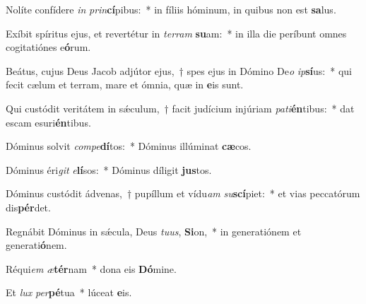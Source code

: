 \item Nolíte confídere \textit{in} \textit{prin}\textbf{cí}pibus:~* in fíliis hóminum, in quibus non est \textbf{sa}lus.

\item Exíbit spíritus ejus, et revertétur in \textit{ter}\textit{ram} \textbf{su}am:~* in illa die períbunt omnes cogitatiónes e\textbf{ó}rum.

\item Beátus, cujus Deus Jacob adjútor ejus,~† spes ejus in Dómino De\textit{o} \textit{ip}\textbf{sí}us:~* qui fecit cælum et terram, mare et ómnia, quæ in \textbf{e}is sunt.

\item Qui custódit veritátem in sǽculum,~† facit judícium injúriam \textit{pa}\textit{ti}\textbf{én}tibus:~* dat escam esuri\textbf{én}tibus.

\item Dóminus solvit \textit{com}\textit{pe}\textbf{dí}tos:~* Dóminus illúminat \textbf{cæ}cos.

\item Dóminus éri\textit{git} \textit{e}\textbf{lí}sos:~* Dóminus díligit \textbf{jus}tos.

\item Dóminus custódit ádvenas,~† pupíllum et vídu\textit{am} \textit{su}\textbf{scí}piet:~* et vias peccatórum dis\textbf{pér}det.

\item Regnábit Dóminus in sǽcula, Deus \textit{tu}\textit{us}, \textbf{Si}on,~* in generatiónem et generati\textbf{ó}nem.

\item Réqui\textit{em} \textit{æ}\textbf{tér}nam~* dona eis \textbf{Dó}mine.

\item Et \textit{lux} \textit{per}\textbf{pé}tua~* lúceat \textbf{e}is.